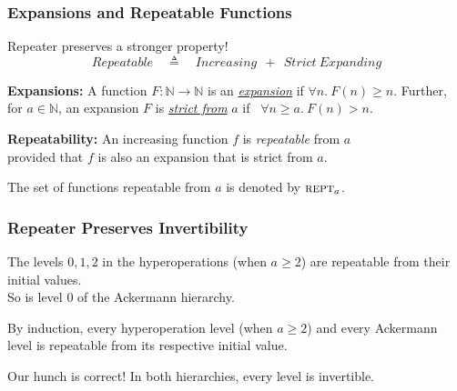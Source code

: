 \begin{frame}
\frametitle{Expansions and Repeatable Functions}

%
%
%

Repeater preserves a stronger property!
\begin{equation*}
Repeatable \quad \triangleq \quad Increasing~~+~~Strict \ Expanding
\end{equation*}

\pause 
\textbf{Expansions:} A function $F:\mathbb{N}\to\mathbb{N}$ is an
\href{https://github.com/inv-ack/inv-ack/blob/7270e64a2600b771f2b1b1b151f7d13fb2ae6c97/increasing_expanding.v\#L80-L82}{\emph{expansion}} if $\forall n.~ F(n)\ge n$. Further, for $a\in \mathbb{N}$, an expansion $F$ is
\href{https://github.com/inv-ack/inv-ack/blob/7270e64a2600b771f2b1b1b151f7d13fb2ae6c97/increasing_expanding.v\#L84-L86}{\emph{strict from}} $a$ if ~$\forall n \ge a.~ F(n) > n$.

\bigskip

\pause 
\textbf{Repeatability:} An increasing function $f$ is \emph{repeatable} from $a$ \\provided that $f$ is also an expansion that is strict from $a$.

\smallskip

The set of functions repeatable from $a$ is denoted by $\text{\scshape{rept}}_a$.

\end{frame}


\begin{frame}
\frametitle{Repeater Preserves Invertibility}
\label{frame:repeatable2}


\bigskip

\pause 
The levels $0, 1, 2$ in the hyperoperations (when $a\ge 2$) are repeatable from their initial values.\\
So is level $0$ of the Ackermann hierarchy. 

\bigskip

\pause 
By induction, every hyperoperation level (when $a\ge 2$) and every Ackermann level is repeatable from its respective initial value.

\bigskip

\pause 
Our hunch is correct! In both hierarchies, every level is invertible.

\end{frame}


